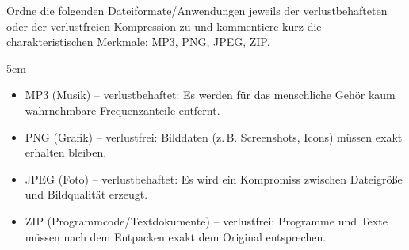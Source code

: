 \question[3]
Ordne die folgenden Dateiformate/Anwendungen jeweils der verlustbehafteten 
oder der verlustfreien Kompression zu und kommentiere kurz die charakteristischen Merkmale: MP3, PNG, JPEG, ZIP.

\begin{solutionbox}{5cm}
\begin{itemize}
\item MP3 (Musik) -- verlustbehaftet: Es werden für das menschliche Gehör kaum wahrnehmbare Frequenzanteile entfernt.
\item PNG (Grafik) -- verlustfrei: Bilddaten (z.\,B. Screenshots, Icons) müssen exakt erhalten bleiben.
\item JPEG (Foto) -- verlustbehaftet: Es wird ein Kompromiss zwischen Dateigröße und Bildqualität erzeugt.
\item ZIP (Programmcode/Textdokumente) -- verlustfrei: Programme und Texte müssen nach dem Entpacken exakt dem Original entsprechen.
\end{itemize}
\end{solutionbox}
